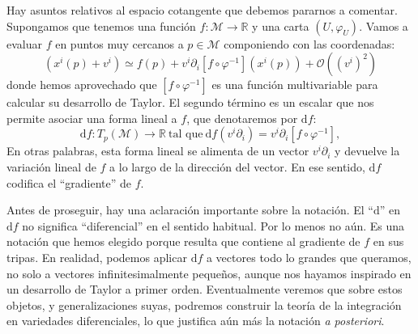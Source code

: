 Hay asuntos relativos al espacio cotangente que debemos pararnos a comentar. Supongamos que tenemos una función \(f:\mathcal{M}\rightarrow\mathbb{R}\) y una carta \((U,\varphi_U)\). Vamos a evaluar \(f\) en puntos muy cercanos a \(p\in\mathcal{M}\) componiendo con las coordenadas:
\begin{equation}
    [f\circ\varphi^{-1}]\left(x^i(p)+v^i\right) \simeq f(p) + v^i \partial_i\left[f\circ\varphi^{-1}\right]\left(x^i(p)\right) + \mathcal{O}\left((v^i)^2\right)
\end{equation}
donde hemos aprovechado que \(\left[f\circ\varphi^{-1}\right]\) es una función multivariable para calcular su desarrollo de Taylor. El segundo término es un escalar que nos permite asociar una forma lineal a \(f\), que denotaremos por \(\mathrm{d}f\):
\begin{equation}
    \mathrm{d}f:T_p(\mathcal{M})\rightarrow \mathbb{R}\ \text{tal que}\ \mathrm{d}f\left(v^i\partial_i\right) = v^i\partial_i\left[f\circ\varphi^{-1}\right],
\end{equation}
En otras palabras, esta forma lineal se alimenta de un vector \(v^i\partial_i\) y devuelve la variación lineal de \(f\) a lo largo de la dirección del vector. En ese sentido, \(\mathrm{d}f\) codifica el ``gradiente'' de \(f\).

Antes de proseguir, hay una aclaración importante sobre la notación. El ``\(\mathrm{d}\)'' en \(\mathrm{d}f\) no significa ``diferencial'' en el sentido habitual. Por lo menos no aún. Es una notación que hemos elegido porque resulta que contiene al gradiente de \(f\) en sus tripas. En realidad, podemos aplicar \(\mathrm{d}f\) a vectores todo lo grandes que queramos, no solo a vectores infinitesimalmente pequeños, aunque nos hayamos inspirado en un desarrollo de Taylor a primer orden. Eventualmente veremos que sobre estos objetos, y generalizaciones suyas, podremos construir la teoría de la integración en variedades diferenciales, lo que justifica aún más la notación \textit{a posteriori}. 


